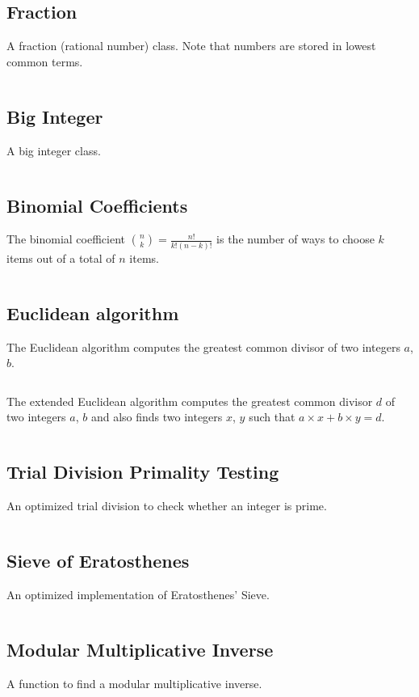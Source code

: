 \documentclass[9pt,a4paper]{amsart}
\newcommand{\code}[1]{\inputminted[linenos]{cpp}{_code/#1}}
\begin{document}
    \subsection{Fraction}
        A fraction (rational number) class. Note that numbers are stored in
        lowest common terms.
        \code{mathematics/fraction.cpp}

    \subsection{Big Integer}
        A big integer class.
        \code{mathematics/intx.cpp}

    \subsection{Binomial Coefficients}
        The binomial coefficient $\binom{n}{k} = \frac{n!}{k!(n-k)!}$ is the
        number of ways to choose $k$ items out of a total of $n$ items.
        \code{mathematics/nck.cpp}

    \subsection{Euclidean algorithm}
        The Euclidean algorithm computes the greatest common divisor of two
        integers $a$, $b$.
        \code{mathematics/gcd.cpp}

        The extended Euclidean algorithm computes the greatest common divisor
        $d$ of two integers $a$, $b$ and also finds two integers $x$, $y$ such
        that $a\times x + b\times y = d$.
        \code{mathematics/egcd.cpp}

    \subsection{Trial Division Primality Testing}
        An optimized trial division to check whether an integer is prime.
        \code{mathematics/is_prime.cpp}

    \subsection{Sieve of Eratosthenes}
        An optimized implementation of Eratosthenes' Sieve.
        \code{mathematics/prime_sieve.cpp}

    \subsection{Modular Multiplicative Inverse}
        A function to find a modular multiplicative inverse.
        \code{mathematics/mod_inv.cpp}
\end{document}

